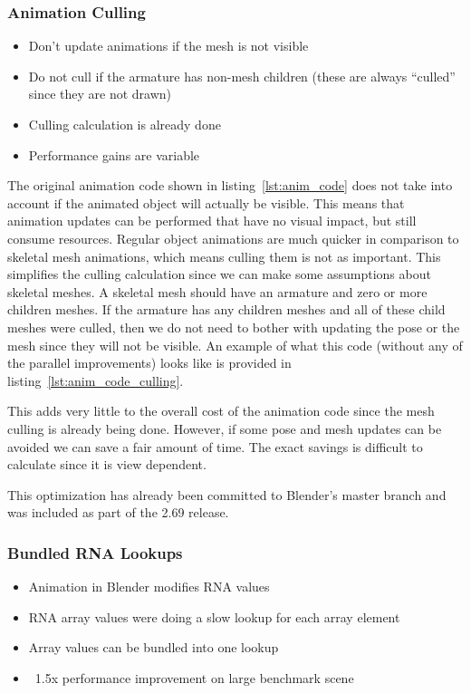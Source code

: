\subsubsection{Animation Culling}
\ifsummaries
\begin{itemize}
 \item Don't update animations if the mesh is not visible
 \item Do not cull if the armature has non-mesh children (these are always ``culled'' since they are not drawn)
 \item Culling calculation is already done
 \item Performance gains are variable
\end{itemize}
\fi

The original animation code shown in listing~\ref{lst:anim_code} does not take into account if the animated object will actually be visible.
This means that animation updates can be performed that have no visual impact, but still consume resources.
Regular object animations are much quicker in comparison to skeletal mesh animations, which means culling them is not as important.
This simplifies the culling calculation since we can make some assumptions about skeletal meshes.
A skeletal mesh should have an armature and zero or more children meshes.
If the armature has any children meshes and all of these child meshes were culled, then we do not need to bother with updating the pose or the mesh since they will not be visible.
An example of what this code (without any of the parallel improvements) looks like is provided in listing~\ref{lst:anim_code_culling}.


This adds very little to the overall cost of the animation code since the mesh culling is already being done.
However, if some pose and mesh updates can be avoided we can save a fair amount of time.
The exact savings is difficult to calculate since it is view dependent.

This optimization has already been committed to Blender's master branch and was included as part of the 2.69 release.

\subsubsection{Bundled RNA Lookups}
\ifsummaries
\begin{itemize}
 \item Animation in Blender modifies RNA values
 \item RNA array values were doing a slow lookup for each array element
 \item Array values can be bundled into one lookup
 \item ~1.5x performance improvement on large benchmark scene
\end{itemize}
\fi

